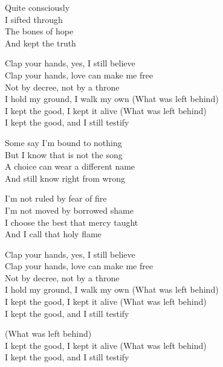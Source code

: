 \begin{lyrics}
Quite consciously\\
I sifted through\\
The bones of hope\\
And kept the truth

Clap your hands, yes, I still believe\\
Clap your hands, love can make me free\\
Not by decree, not by a throne\\
I hold my ground, I walk my own
(What was left behind)\\
I kept the good, I kept it alive
(What was left behind)\\
I kept the good, and I still testify

Some say I’m bound to nothing\\
But I know that is not the song\\
A choice can wear a different name\\
And still know right from wrong

I’m not ruled by fear of fire\\
I’m not moved by borrowed shame\\
I choose the best that mercy taught\\
And I call that holy flame

Clap your hands, yes, I still believe\\
Clap your hands, love can make me free\\
Not by decree, not by a throne\\
I hold my ground, I walk my own
(What was left behind)\\
I kept the good, I kept it alive
(What was left behind)\\
I kept the good, and I still testify

(What was left behind)\\
I kept the good, I kept it alive
(What was left behind)\\
I kept the good, and I still testify
\end{lyrics}

